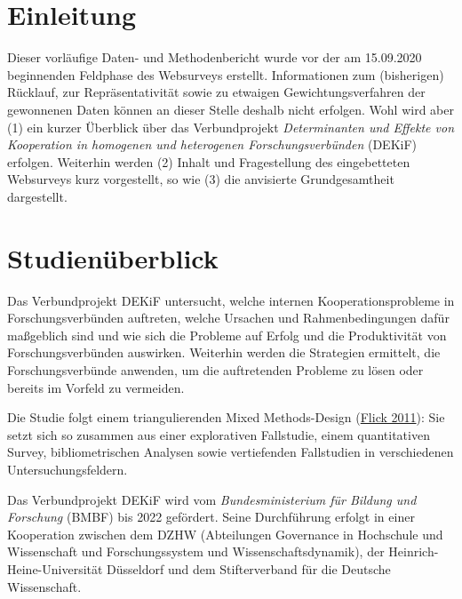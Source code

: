 \documentclass[a4paper,10pt,twoside]{article}
\begin{document}
\hypertarget{einleitung}{%
\section{Einleitung}\label{einleitung}}

Dieser vorläufige Daten- und Methodenbericht wurde vor der am 15.09.2020 beginnenden Feldphase des Websurveys erstellt. Informationen zum (bisherigen) Rücklauf, zur Repräsentativität sowie zu etwaigen Gewichtungsverfahren der gewonnenen Daten können an dieser Stelle deshalb nicht erfolgen. Wohl wird aber (1) ein kurzer Überblick über das Verbundprojekt \emph{Determinanten und Effekte von Kooperation in homogenen und heterogenen Forschungsverbünden} (DEKiF) erfolgen. Weiterhin werden (2) Inhalt und Fragestellung des eingebetteten Websurveys kurz vorgestellt, so wie (3) die anvisierte Grundgesamtheit dargestellt.

\hypertarget{studienuxfcberblick}{%
\section{Studienüberblick}\label{studienuxfcberblick}}

Das Verbundprojekt DEKiF untersucht, welche internen Kooperationsprobleme in Forschungsverbünden auftreten, welche Ursachen und Rahmenbedingungen dafür maßgeblich sind und wie sich die Probleme auf Erfolg und die Produktivität von Forschungsverbünden auswirken. Weiterhin werden die Strategien ermittelt, die Forschungsverbünde anwenden, um die auftretenden Probleme zu lösen oder bereits im Vorfeld zu vermeiden.

\vspace{3 mm}

Die Studie folgt einem triangulierenden Mixed Methods-Design (\protect\hyperlink{ref-flickTriangulationEinfuehrung2011}{Flick 2011}): Sie setzt sich so zusammen aus einer explorativen Fallstudie, einem quantitativen Survey, bibliometrischen Analysen sowie vertiefenden Fallstudien in verschiedenen Untersuchungsfeldern.

\vspace{3 mm}

Das Verbundprojekt DEKiF wird vom \emph{Bundesministerium für Bildung und Forschung} (BMBF) bis 2022 gefördert. Seine Durchführung erfolgt in einer Kooperation zwischen dem DZHW (Abteilungen Governance in Hochschule und Wissenschaft und Forschungssystem und Wissenschaftsdynamik), der Heinrich-Heine-Universität Düsseldorf und dem Stifterverband für die Deutsche Wissenschaft.
\end{document}

